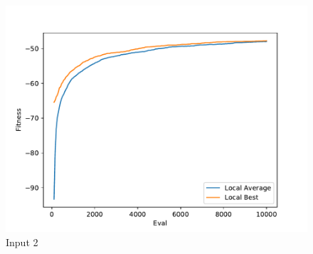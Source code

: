 \documentclass{standalone}
\begin{document}
\begin{figure}[!htb]
	\caption{Input 2}
	\label{fig:graph_2018}
	\includegraphics[width=\textwidth]{../graphs/graphs/2018.pdf}
\end{figure}
\end{document}
